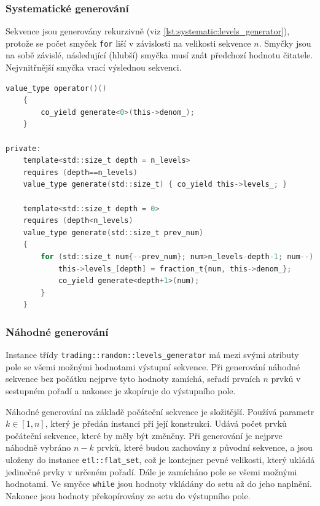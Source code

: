 \subsubsection{Systematické generování}
Sekvence jsou generovány rekurzivně (viz \ref{lst:systematic:levels_generator}), protože se počet smyček \texttt{for} liší v závislosti na velikosti sekvence $n$.
Smyčky jsou na sobě závislé, následující (hlubší) smyčka musí znát předchozí hodnotu čitatele.
Nejvnitřnější smyčka vrací výslednou sekvenci.

\begin{lstlisting}[caption={~Metody pro systematické generování úrovní nákupu},label={lst:systematic:levels_generator},captionpos=t,abovecaptionskip=-\medskipamount,belowcaptionskip=\medskipamount,language=C]
    value_type operator()()
    {
        co_yield generate<0>(this->denom_);
    }

private:
    template<std::size_t depth = n_levels>
    requires (depth==n_levels)
    value_type generate(std::size_t) { co_yield this->levels_; }
    
    template<std::size_t depth = 0>
    requires (depth<n_levels)
    value_type generate(std::size_t prev_num)
    {
        for (std::size_t num{--prev_num}; num>n_levels-depth-1; num--) {
            this->levels_[depth] = fraction_t{num, this->denom_};
            co_yield generate<depth+1>(num);
        }
    }
\end{lstlisting}

\subsubsection{Náhodné generování}
Instance třídy \texttt{trading::random::levels\_generator} má mezi svými atributy pole se všemi možnými hodnotami výstupní sekvence.
Při generování náhodné sekvence bez počátku nejprve tyto hodnoty zamíchá, seřadí prvních $n$ prvků v sestupném pořadí a nakonec je zkopíruje do výstupního pole.

Náhodné generování na základě počáteční sekvence je složitější.
Používá parametr $k \in [1, n] $, který je předán instanci při její konstrukci.
Udává počet prvků počáteční sekvence, které by měly být změněny.
Při generování je nejprve náhodně vybráno $n-k$ prvků, které budou zachovány z původní sekvence, a jsou uloženy do instance \texttt{etl::flat\_set}, což je kontejner pevné velikosti, který ukládá jedinečné prvky v určeném pořadí.
Dále je zamícháno pole se všemi možnými hodnotami.
Ve smyčce \texttt{while} jsou hodnoty vkládány do setu až do jeho naplnění.
Nakonec jsou hodnoty překopírovány ze setu do výstupního pole.

